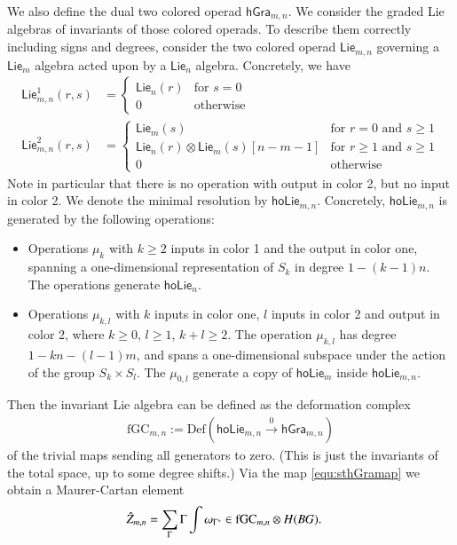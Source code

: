 \documentclass[a4paper]{amsart}
\theoremstyle{plain}
\theoremstyle{definition}
\newcommand{\hGra}{{\mathsf{hGra}}}
\newcommand{\Def}{\mathrm{Def}}
\newcommand{\Lie}{\mathsf{Lie}}
\newcommand{\hoLie}{\mathsf{hoLie}}
\newcommand{\fGC}{\mathrm{fGC}}
\begin{document}
We also define the dual two colored operad $\hGra_{m,n}$.
We consider the graded Lie algebras of invariants of those colored operads.
To describe them correctly including signs and degrees, consider the two colored operad $\Lie_{m,n}$ governing a $\Lie_m$ algebra acted upon by a $\Lie_n$ algebra. 
Concretely, we have
\begin{align*}
\Lie_{m,n}^1(r,s) &=
\begin{cases}
\Lie_n(r) &\text{for $s=0$} \\
0 &\text{otherwise}
\end{cases}
\\
\Lie_{m,n}^2(r,s) &=
\begin{cases}
\Lie_m(s) &\text{for $r=0$ and $s\geq 1$} \\
\Lie_n(r) \otimes \Lie_m(s)[n-m-1] &\text{for $r\geq 1$ and $s\geq 1$} \\
0 &\text{otherwise}
\end{cases}
\end{align*}
Note in particular that there is no operation with output in color 2, but no input in color 2.
We denote the minimal resolution by $\hoLie_{m,n}$.
Concretely, $\hoLie_{m,n}$ is generated by the following operations: 
\begin{itemize}
 \item Operations $\mu_k$ with $k\geq 2$ inputs in color 1 and the output in color one, spanning a one-dimensional representation of $S_k$ in degree $1-(k-1)n$. The operations generate $\hoLie_n$.
\item Operations $\mu_{k,l}$ with $k$ inputs in color one, $l$ inputs in color 2 and output in color 2, where $k\geq 0$, $l\geq 1$, $k+l\geq 2$. The operation $\mu_{k,l}$ has degree $1-kn-(l-1)m$, and spans a one-dimensional subspace under the action of the group $S_k\times S_l$.
The $\mu_{0,l}$ generate a copy of $\hoLie_m$ inside $\hoLie_{m,n}$.
\end{itemize}


Then the invariant Lie algebra can be defined as the deformation complex
\begin{align*}
\fGC_{m,n} := \Def(\hoLie_{m,n}\stackrel{0}\to \hGra_{m,n})
\end{align*}
of the trivial maps sending all generators to zero. (This is just the invariants of the total space, up to some degree shifts.)
Via the map \eqref{equ:sthGramap} we obtain a Maurer-Cartan element
\begin{align*}
\hZ_{m,n} &= \sum_\Gamma \Gamma \int \omega_{\Gamma^*} \in \fGC_{m,n}\otimes H(BG).
\end{align*}
\end{document}
